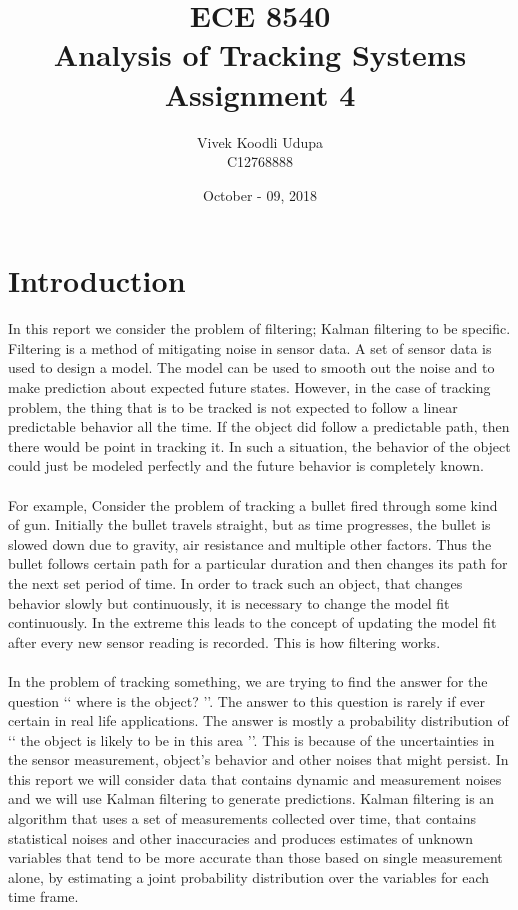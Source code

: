 \documentclass[12pt]{article}
\title{ECE 8540 \\ Analysis of Tracking Systems \\ 
	Assignment 4}
\author{Vivek Koodli Udupa \\ C12768888}
\date{October - 09, 2018 }
\begin{document}
\begin{titlepage}
\maketitle
{}%
\end{titlepage}



\section{Introduction}
In this report we consider the problem of filtering; Kalman filtering to be specific. Filtering is a method of mitigating noise in sensor data. A set of sensor data is used to design a model. The model can be used to smooth out the noise and to make prediction about expected future states. However, in the case of tracking problem, the thing that is to be tracked is not expected to follow a linear predictable behavior all the time. If the object did follow a predictable path, then there would be point in tracking it. In such a situation, the behavior of the object could just be modeled perfectly and the future behavior is completely known.  \\
\\
For example, Consider the problem of tracking a bullet fired through some kind of gun. Initially the bullet travels straight, but as time progresses, the bullet is slowed down due to gravity, air resistance and multiple other factors. Thus the bullet follows certain path for a particular duration and then changes its path for the next set period of time. In order to track such an object, that changes behavior slowly but continuously, it is necessary to change the model fit continuously. In the extreme this leads to the concept of updating the model fit after every new sensor reading is recorded. This is how filtering works. \\
\\
In the problem of tracking something, we are trying to find the answer for the question \lq\lq{} where is the object? \rq\rq{}. The answer to this question is rarely if ever certain in real life applications. The answer is mostly a probability distribution of \lq\lq{} the object is likely to be in this area \rq\rq{}. This is because of the uncertainties in the sensor measurement, object's behavior and other noises that might persist. In this report we will consider data that contains dynamic and measurement noises and we will use Kalman filtering to generate predictions. Kalman filtering is an algorithm that uses a set of measurements collected over time, that contains statistical noises and other inaccuracies and produces estimates of unknown variables that tend to be more accurate than those based on single measurement alone, by estimating a joint probability distribution over the variables for each time frame.\\
\end{document}
